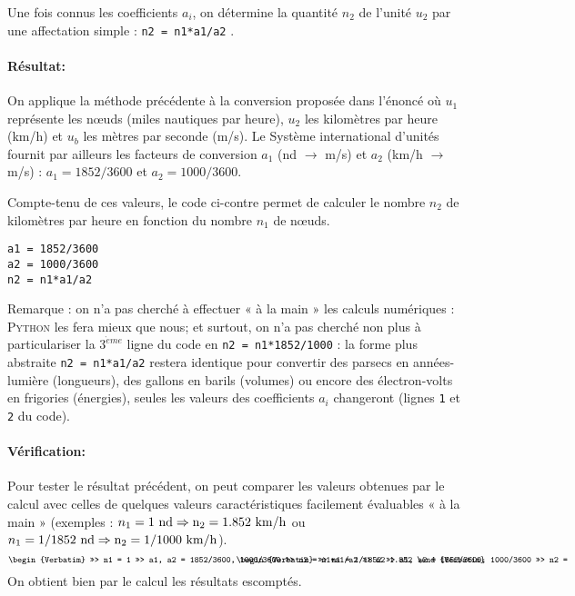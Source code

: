 \documentclass[11pt,a4paper,colorlinks,breaklinks]{article}
\def\python{\textsc{Python}}
\begin{document}
Une fois connus les coefficients $a_i$, on détermine la quantité $n_2$ de l'unité $u_2$
par une affectation simple : \texttt{n2 = n1*a1/a2} .

\paragraph{Résultat:} On applique la méthode précédente à la conversion
proposée dans l'énoncé où $u_1$ représente les n\oe uds (miles nautiques par heure), 
$u_2$ les kilomètres par heure (km/h) et $u_b$ les mètres par seconde (m/s).
Le Système international d'unités fournit par ailleurs les facteurs 
de conversion $a_1$ (nd $\rightarrow$ m/s) et $a_2$ (km/h $\rightarrow$ m/s) :
$a_1 = 1852/3600$ et $a_2 = 1000/3600$.


\noindent\begin{minipage}[t]{7cm}
Compte-tenu de ces valeurs, le code ci-contre
permet de calculer le nombre $n_2$ de kilomètres par heure
en fonction du nombre $n_1$ de n\oe uds.
\end{minipage}
\hfill
\begin{minipage}[t]{8cm}
\begin{lstlisting}
a1 = 1852/3600
a2 = 1000/3600
n2 = n1*a1/a2
\end{lstlisting}
\end{minipage}

Remarque : on n'a pas cherché à effectuer « à la main » les calculs numériques :
\python{} les fera mieux que nous; et surtout, on n'a pas cherché non plus à 
particulariser la $3^{\grave eme}$ ligne du code en \texttt{n2 = n1*1852/1000} :
la forme plus abstraite \texttt{n2 = n1*a1/a2} restera identique pour convertir 
des parsecs en années-lumière (longueurs), des gallons en barils (volumes) ou 
encore des électron-volts en frigories (énergies), seules les valeurs des coefficients $a_i$ changeront (lignes \texttt{1} 
et \texttt{2} du code).

\paragraph{Vérification:}
Pour tester le résultat précédent, on peut comparer les valeurs obtenues par le calcul 
avec celles de quelques valeurs caractéristiques facilement évaluables « à la main »
(exemples : $n_1 = 1\ \rm{nd} \Rightarrow{} n_2 = 1.852\ \rm{km/h}$ ou
$n_1 = 1/1852\ \rm{nd} \Rightarrow{} n_2 = 1/1000\ \rm{km/h}$).
$$\begin{minipage}[t]{7.5cm}\footnotesize
\begin{Verbatim}
>>> n1 = 1
>>> a1, a2 = 1852/3600, 1000/3600
>>> n2 = n1*a1/a2
>>> n2
1.852
\end{Verbatim}
\end{minipage}
\hfill
\begin{minipage}[t]{7.5cm}\footnotesize
\begin{Verbatim}
>>> n1 = 1/1852
>>> a1, a2 = 1852/3600, 1000/3600
>>> n2 = n1*a1/a2
>>> n2
0.0010000000000000002
\end{Verbatim}
\end{minipage}$$
On obtient bien par le calcul les résultats escomptés.

\end{document}
